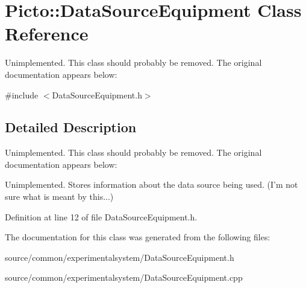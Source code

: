 \hypertarget{class_picto_1_1_data_source_equipment}{\section{Picto\-:\-:Data\-Source\-Equipment Class Reference}
\label{class_picto_1_1_data_source_equipment}
}


Unimplemented. This class should probably be removed. The original documentation appears below\-:  




{\ttfamily \#include $<$Data\-Source\-Equipment.\-h$>$}



\subsection{Detailed Description}
Unimplemented. This class should probably be removed. The original documentation appears below\-: 

Unimplemented. Stores information about the data source being used. (I'm not sure what is meant by this...) 

Definition at line 12 of file Data\-Source\-Equipment.\-h.



The documentation for this class was generated from the following files\-:\begin{DoxyCompactItemize}
\item 
source/common/experimentalsystem/Data\-Source\-Equipment.\-h\item 
source/common/experimentalsystem/Data\-Source\-Equipment.\-cpp\end{DoxyCompactItemize}
